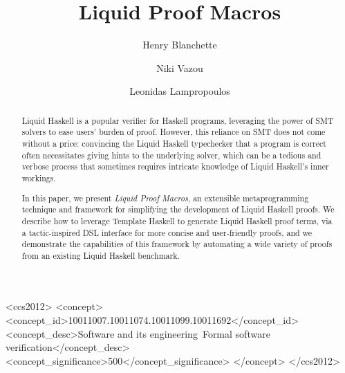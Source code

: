 \documentclass[sigplan,screen]{acmart}
\begin{document}
\title{Liquid Proof Macros}

\author{Henry Blanchette}

\author{Niki Vazou}

\author{Leonidas Lampropoulos}

\renewcommand{\shortauthors}{Blanchette et al.}

\begin{abstract}
Liquid Haskell is a popular verifier for Haskell programs,
leveraging the power of SMT solvers to ease users' burden of proof.
%
However, this reliance on SMT does not come without a price:
convincing the Liquid Haskell typechecker that a program is correct
often necessitates giving hints to the underlying solver, which can be
a tedious and verbose process that sometimes requires intricate
knowledge of Liquid Haskell's inner workings.

In this paper, we present {\em Liquid Proof Macros}, an extensible
metaprogramming technique and framework for simplifying the
development of Liquid Haskell proofs.
%
We describe how to leverage Template Haskell 
to generate Liquid Haskell proof terms, via a tactic-inspired DSL interface for
more concise and user-friendly proofs, 
%
and we demonstrate the capabilities of this framework by automating
a wide variety of proofs from an existing Liquid Haskell benchmark.
\end{abstract}

\begin{CCSXML}
<ccs2012>
   <concept>
       <concept_id>10011007.10011074.10011099.10011692</concept_id>
       <concept_desc>Software and its engineering~Formal software verification</concept_desc>
       <concept_significance>500</concept_significance>
       </concept>
 </ccs2012>
\end{CCSXML}
\end{document}
